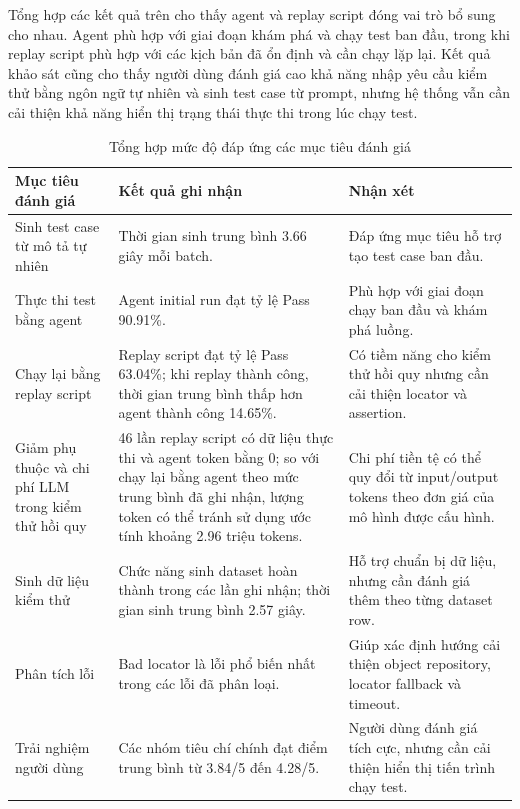Tổng hợp các kết quả trên cho thấy agent và replay script đóng vai trò bổ sung cho nhau. Agent phù hợp với giai đoạn khám phá và chạy test ban đầu, trong khi replay script phù hợp với các kịch bản đã ổn định và cần chạy lặp lại. Kết quả khảo sát cũng cho thấy người dùng đánh giá cao khả năng nhập yêu cầu kiểm thử bằng ngôn ngữ tự nhiên và sinh test case từ prompt, nhưng hệ thống vẫn cần cải thiện khả năng hiển thị trạng thái thực thi trong lúc chạy test.

\begin{table}[H]
\centering
\caption{Tổng hợp mức độ đáp ứng các mục tiêu đánh giá}
\label{tab:chapter6_evaluation_objective_summary}
\small
\renewcommand{\arraystretch}{1.2}
\begin{tabular}{|p{5.0cm}|p{5.0cm}|p{4.0cm}|}
\hline
\textbf{Mục tiêu đánh giá} & \textbf{Kết quả ghi nhận} & \textbf{Nhận xét} \\
\hline
Sinh test case từ mô tả tự nhiên & Thời gian sinh trung bình 3.66 giây mỗi batch. & Đáp ứng mục tiêu hỗ trợ tạo test case ban đầu. \\
\hline
Thực thi test bằng agent & Agent initial run đạt tỷ lệ Pass 90.91\%. & Phù hợp với giai đoạn chạy ban đầu và khám phá luồng. \\
\hline
Chạy lại bằng replay script & Replay script đạt tỷ lệ Pass 63.04\%; khi replay thành công, thời gian trung bình thấp hơn agent thành công 14.65\%. & Có tiềm năng cho kiểm thử hồi quy nhưng cần cải thiện locator và assertion. \\
\hline
Giảm phụ thuộc và chi phí LLM trong kiểm thử hồi quy & 46 lần replay script có dữ liệu thực thi và agent token bằng 0; so với chạy lại bằng agent theo mức trung bình đã ghi nhận, lượng token có thể tránh sử dụng ước tính khoảng 2.96 triệu tokens. & Chi phí tiền tệ có thể quy đổi từ input/output tokens theo đơn giá của mô hình được cấu hình. \\
\hline
Sinh dữ liệu kiểm thử & Chức năng sinh dataset hoàn thành trong các lần ghi nhận; thời gian sinh trung bình 2.57 giây. & Hỗ trợ chuẩn bị dữ liệu, nhưng cần đánh giá thêm theo từng dataset row. \\
\hline
Phân tích lỗi & Bad locator là lỗi phổ biến nhất trong các lỗi đã phân loại. & Giúp xác định hướng cải thiện object repository, locator fallback và timeout. \\
\hline
Trải nghiệm người dùng & Các nhóm tiêu chí chính đạt điểm trung bình từ 3.84/5 đến 4.28/5. & Người dùng đánh giá tích cực, nhưng cần cải thiện hiển thị tiến trình chạy test. \\
\hline
\end{tabular}
\end{table}

